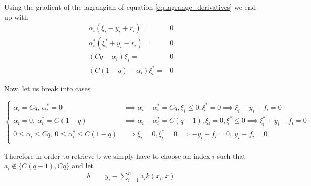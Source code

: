 Using the gradient of the lagrangian of equation \ref{eq:lagrange_derivatives} we end up with
\begin{equation}
    \begin{aligned}
        \alpha_i(\xi_i-y_i+r_i)=&0
        \\
        \alpha_i^*(\xi_i^*+y_i-r_i)=&0
        \\
        (Cq-\alpha_i) \xi_i=&0
        \\
        (C(1-q)-\alpha_i) \xi_i^*=&0
    \end{aligned}
\end{equation}

Now, let us break into cases

\begin{equation}
\begin{cases}
    \alpha_i=Cq, \ \alpha_i^*=0 & \implies \alpha_i-\alpha_i^*=Cq, \xi_i\leq 0, \xi^*=0\implies \xi_i-y_i+f_i=0 \\
    \alpha_i=0, \ \alpha_i^*=C(1-q) & \implies \alpha_i-\alpha_i^*=C(q-1), \xi_i= 0, \xi^*\leq 0 \implies \xi_i^*+y_i-f_i=0 \\
    0\leq \alpha_i\leq Cq, \ 0\leq \alpha_i^*\leq C(1-q) & \implies \xi_i=0,  \xi^*_i= 0 \implies -y_i+f_i=0, \ y_i-f_i=0 \\
\end{cases}
\end{equation}

Therefore in order to retrieve b we simply have to choose an index $i$ such that  $\textrm{a}_i \not \in \{C(q-1), Cq\}$
and let
\begin{equation}
    \begin{aligned}
    b=&y_i-\sum\limits_{i=1}^n \textrm{a}_i k(x_i,x)
    \end{aligned}
\end{equation}


